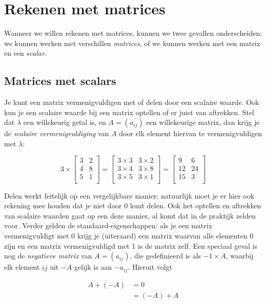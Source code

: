 
\section{Rekenen met matrices}
Wanneer we willen rekenen met matrices, kunnen we twee gevallen onderscheiden: we kunnen werken met verschillen \textit{matrices}, of we kunnen werken met een matrix en een \textit{scalar}.

\subsection{Matrices met scalars}
Je kunt een matrix vermenigvuldigen met of delen door een scalaire waarde. Ook kun je een scalaire waarde bij een matrix optellen of er juist van aftrekken. Stel dat $\lambda$ een willekeurig getal is, en $A = (a_{ij})$ een willekeurige matrix, dan krijg je de \textit{scalaire vermenigvuldiging} van $A$ door elk element hiervan te vermenigvuldigen met $\lambda$: 

\[
3 \times \begin{bmatrix}
3 & 2 \\
4 & 8 \\
5 & 1 \\
\end{bmatrix} =
\begin{bmatrix}
3 \times 3 & 3 \times 2 \\
3 \times 4 & 3 \times 8 \\
3 \times 5 & 3 \times 1\\
\end{bmatrix} =
\begin{bmatrix}
9 & 6 \\
12 & 24 \\
15 & 3 \\
\end{bmatrix}
\]

Delen werkt feitelijk op een vergelijkbare manier; natuurlijk moet je er hier ook rekening mee houden dat je niet door 0 kunt delen. Ook het optellen en aftrekken van scalaire waarden gaat op een deze manier, al komt dat in de praktijk zelden voor. Verder gelden de standaard-eigenschappen: als je een matrix vermenigvuldigt met 0 krijg je (uiteraard) een matrix waarvan alle elementen 0 zijn en een matrix vermenigvuldigd met 1 is de matrix zelf. Een speciaal geval is nog de \textit{negatieve matrix} van $A = (a_{ij})$, die gedefinieerd is als $-1 \times A$, waarbij elk element $ij$ uit $-A$ gelijk is aan $-a_{ij}$. Hieruit volgt

\[
\begin{aligned}
A + (-A) &= 0\\
&= (-A) + A
\end{aligned}
\]


